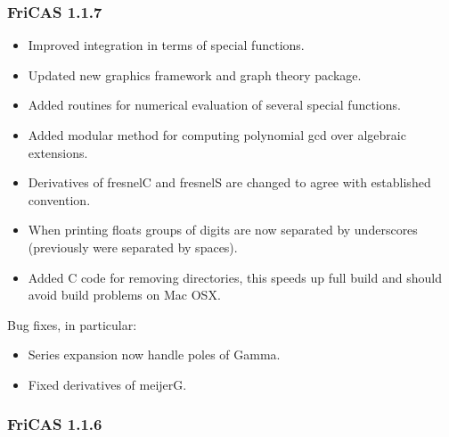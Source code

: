 \subsubsection{FriCAS 1.1.7}

\begin{itemize}
\item Improved integration in terms of special functions.

\item Updated new graphics framework and graph theory package.

\item Added routines for numerical evaluation of several special
  functions.

\item Added modular method for computing polynomial gcd over algebraic
  extensions.

\item Derivatives of fresnelC and fresnelS are changed to agree with
  established convention.

\item When printing floats groups of digits are now separated by
  underscores (previously were separated by spaces).

\item Added C code for removing directories, this speeds up full build
  and should avoid build problems on Mac OSX.
\end{itemize}

Bug fixes, in particular:

\begin{itemize}
\item Series expansion now handle poles of Gamma.

\item Fixed derivatives of meijerG.
\end{itemize}

\subsubsection{FriCAS 1.1.6}


